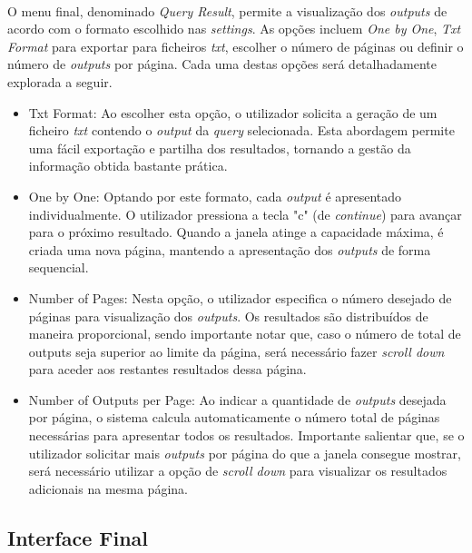 \documentclass{article}
\begin{document}
\paragraph{}O menu final, denominado \textit{Query Result}, permite a visualização dos \textit{outputs} de acordo com o formato escolhido nas \textit{settings}. As opções incluem \textit{One by One}, \textit{Txt Format} para exportar para ficheiros \textit{txt}, escolher o número de páginas ou definir o número de \textit{outputs} por página. Cada uma destas opções será detalhadamente explorada a seguir. 
\begin{itemize}
    \item Txt Format: Ao escolher esta opção, o utilizador solicita a geração de um ficheiro \textit{txt} contendo o \textit{output} da \textit{query} selecionada. Esta abordagem permite uma fácil exportação e partilha dos resultados, tornando a gestão da informação obtida bastante prática.
    \item One by One: Optando por este formato, cada \textit{output} é apresentado individualmente. O utilizador pressiona a tecla "c" (de \textit{continue}) para avançar para o próximo resultado. Quando a janela atinge a capacidade máxima, é criada uma nova página, mantendo a apresentação dos \textit{outputs} de forma sequencial.
    \item Number of Pages: Nesta opção, o utilizador especifica o número desejado de páginas para visualização dos \textit{outputs}. Os resultados são distribuídos de maneira proporcional, sendo importante notar que, caso o número de total de outputs seja superior ao limite da página, será necessário fazer \textit{scroll down} para aceder aos restantes resultados dessa página.
    \item Number of Outputs per Page: Ao indicar a quantidade de \textit{outputs} desejada por página, o sistema calcula automaticamente o número total de páginas necessárias para apresentar todos os resultados. Importante salientar que, se o utilizador solicitar mais \textit{outputs} por página do que a janela consegue mostrar, será necessário utilizar a opção de \textit{scroll down} para visualizar os resultados adicionais na mesma página.
\end{itemize}

\subsection{Interface Final}
\end{document}
